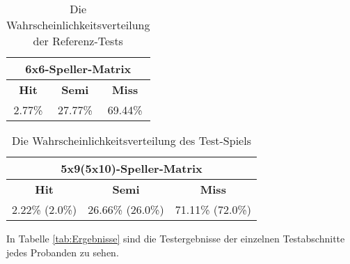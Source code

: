 \begin{table}[h!]
\centering
\footnotesize{
\setlength{\extrarowheight}{5pt}
\begin{tabular}{|ccc|}
\multicolumn{3}{c}{6x6-Speller-Matrix} \\ \hline
\textbf{Hit} & \textbf{Semi} & \textbf{Miss} \\ \hline
2.77\% & 27.77\% & 69.44\% \\ \hline
\end{tabular}}
\caption{Die Wahrscheinlichkeitsverteilung der Referenz-Tests}
\label{tab:randomReference}
\end{table}



\begin{table}[h!]
\centering
\footnotesize{
\setlength{\extrarowheight}{5pt}
\begin{tabular}{|ccc|}
\multicolumn{3}{c}{5x9(5x10)-Speller-Matrix} \\ \hline
\textbf{Hit} & \textbf{Semi} & \textbf{Miss} \\ \hline
2.22\% (2.0\%)& 26.66\% (26.0\%)& 71.11\% (72.0\%) \\ \hline
\end{tabular}}
\caption{Die Wahrscheinlichkeitsverteilung des Test-Spiels}
\label{tab:randomGame}
\end{table}



In Tabelle \ref{tab:Ergebnisse} sind die Testergebnisse der einzelnen Testabschnitte jedes Probanden zu sehen.



